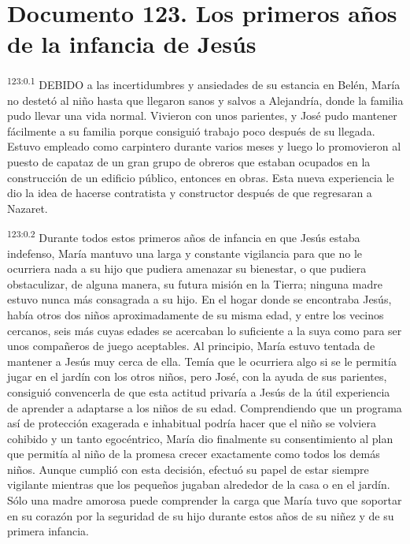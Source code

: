 \chapter{Documento 123. Los primeros años de la infancia de Jesús}
\par 
\textsuperscript{123:0.1} DEBIDO a las incertidumbres y ansiedades de su estancia en Belén, María no destetó al niño hasta que llegaron sanos y salvos a Alejandría, donde la familia pudo llevar una vida normal. Vivieron con unos parientes, y José pudo mantener fácilmente a su familia porque consiguió trabajo poco después de su llegada. Estuvo empleado como carpintero durante varios meses y luego lo promovieron al puesto de capataz de un gran grupo de obreros que estaban ocupados en la construcción de un edificio público, entonces en obras. Esta nueva experiencia le dio la idea de hacerse contratista y constructor después de que regresaran a Nazaret.

\par 
\textsuperscript{123:0.2} Durante todos estos primeros años de infancia en que Jesús estaba indefenso, María mantuvo una larga y constante vigilancia para que no le ocurriera nada a su hijo que pudiera amenazar su bienestar, o que pudiera obstaculizar, de alguna manera, su futura misión en la Tierra; ninguna madre estuvo nunca más consagrada a su hijo. En el hogar donde se encontraba Jesús, había otros dos niños aproximadamente de su misma edad, y entre los vecinos cercanos, seis más cuyas edades se acercaban lo suficiente a la suya como para ser unos compañeros de juego aceptables. Al principio, María estuvo tentada de mantener a Jesús muy cerca de ella. Temía que le ocurriera algo si se le permitía jugar en el jardín con los otros niños, pero José, con la ayuda de sus parientes, consiguió convencerla de que esta actitud privaría a Jesús de la útil experiencia de aprender a adaptarse a los niños de su edad. Comprendiendo que un programa así de protección exagerada e inhabitual podría hacer que el niño se volviera cohibido y un tanto egocéntrico, María dio finalmente su consentimiento al plan que permitía al niño de la promesa crecer exactamente como todos los demás niños. Aunque cumplió con esta decisión, efectuó su papel de estar siempre vigilante mientras que los pequeños jugaban alrededor de la casa o en el jardín. Sólo una madre amorosa puede comprender la carga que María tuvo que soportar en su corazón por la seguridad de su hijo durante estos años de su niñez y de su primera infancia.

